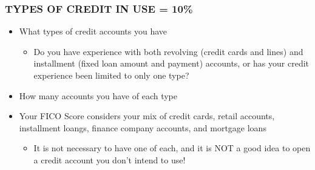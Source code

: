 \documentclass[12pt]{article}
\begin{document}
            \subsubsection{TYPES OF CREDIT IN USE = 10\%}
                \begin{itemize}
                    \item What types of credit accounts you have
                        \begin{itemize}
                            \item Do you have experience with both revolving (credit cards and lines) and installment (fixed loan amount and payment)
                                accounts, or has your credit experience been limited to only one type?
                        \end{itemize}
                    \item How many accounts you have of each type
                    \item Your FICO Score considers your mix of credit cards, retail accounts, installment loangs, finance company accounts, and mortgage loans
                        \begin{itemize}
                            \item It is not necessary to have one of each, and it is NOT a good idea to open a credit account you don't intend to use!
                        \end{itemize}
                \end{itemize}
\end{document}
